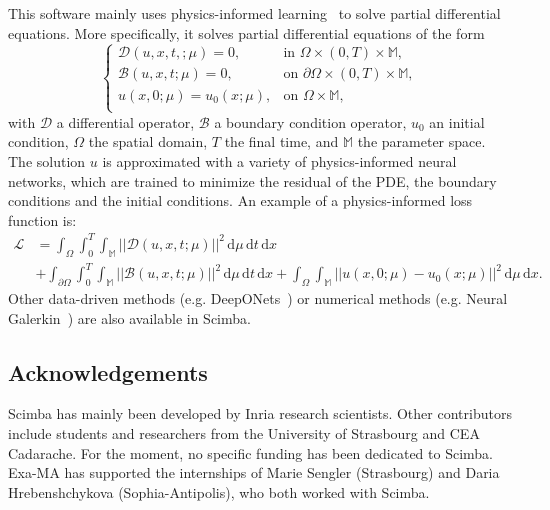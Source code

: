 This software mainly uses physics-informed
learning~\cite{karniadakis_physics-informed_2021}
to solve partial differential equations.
More specifically, it solves partial differential equations of the form
\begin{equation*}
    \begin{cases}
        \mathcal{D}(u, x, t,; \mu) = 0,
         & \text{in } \Omega \times (0,T) \times \mathbb{M},          \\
        \mathcal{B}(u, x, t; \mu) = 0,
         & \text{on } \partial \Omega \times (0,T) \times \mathbb{M}, \\
        u(x, 0; \mu) = u_0(x; \mu),
         & \text{on } \Omega \times \mathbb{M},                       \\
    \end{cases}
\end{equation*}
with $\mathcal{D}$ a differential operator, $\mathcal{B}$ a boundary condition operator,
$u_0$ an initial condition, $\Omega$ the spatial domain,
$T$ the final time, and $\mathbb{M}$ the parameter space.
The solution $u$ is approximated with a variety of physics-informed neural networks,
which are trained to minimize the residual of the PDE,
the boundary conditions and the initial conditions.
An example of a physics-informed loss function is:
\begin{equation*}
    \begin{aligned}
        \mathcal{L} & =
        \int_\Omega \int_0^T \int_{\mathbb{M}}
        ||\mathcal{D}(u, x, t; \mu)||^2 \,
        \mathrm{d}\mu \, \mathrm{d}t \, \mathrm{d}x \\
                    & +
        \int_{\partial\Omega} \int_0^T \int_{\mathbb{M}}
        ||\mathcal{B}(u, x, t; \mu)||^2 \,
        \mathrm{d}\mu \, \mathrm{d}t \, \mathrm{d}x
        +
        \int_{\Omega} \int_{\mathbb{M}}
        ||u(x, 0; \mu) - u_0(x;\mu)||^2 \,
        \mathrm{d}\mu \, \mathrm{d}x.
    \end{aligned}
\end{equation*}
Other data-driven methods
(e.g. DeepONets~\cite{lu_learning_2021})
or numerical methods
(e.g. Neural Galerkin~\cite{bruna_neural_2024})
are also available in Scimba.




\subsection{Acknowledgements}
\label{sec::Scimba:acknowledgements}

Scimba has mainly been developed by Inria research scientists.
Other contributors include students and researchers
from the University of Strasbourg and CEA Cadarache.
For the moment, no specific funding has been dedicated to Scimba.
Exa-MA has supported the internships of Marie Sengler (Strasbourg) and Daria Hrebenshchykova (Sophia-Antipolis), who both worked with Scimba.

